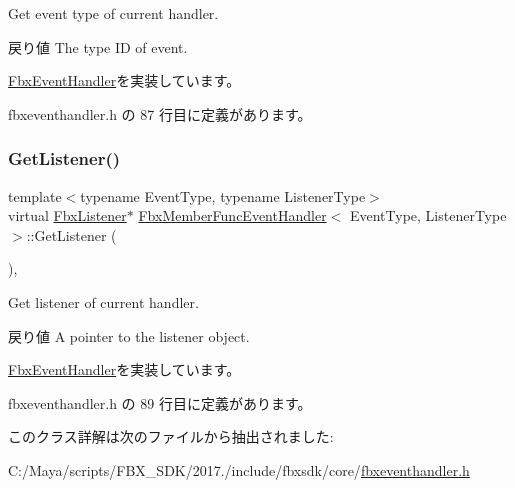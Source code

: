 Get event type of current handler. \begin{DoxyReturn}{戻り値}
The type ID of event. 
\end{DoxyReturn}


\hyperlink{class_fbx_event_handler_a0b42d2b93e63d866975f468a481c9f3c}{Fbx\+Event\+Handler}を実装しています。



 fbxeventhandler.\+h の 87 行目に定義があります。

\mbox{\label{class_fbx_member_func_event_handler_ad45db7b531f23f9e7776c93bec100668}} 
\subsubsection{\texorpdfstring{Get\+Listener()}{GetListener()}}
{\footnotesize\ttfamily template$<$typename Event\+Type, typename Listener\+Type$>$ \\
virtual \hyperlink{class_fbx_listener}{Fbx\+Listener}$\ast$ \hyperlink{class_fbx_member_func_event_handler}{Fbx\+Member\+Func\+Event\+Handler}$<$ Event\+Type, Listener\+Type $>$\+::Get\+Listener (\begin{DoxyParamCaption}{ }\end{DoxyParamCaption})\hspace{0.3cm}{\ttfamily [inline]}, {\ttfamily [virtual]}}

Get listener of current handler. \begin{DoxyReturn}{戻り値}
A pointer to the listener object. 
\end{DoxyReturn}


\hyperlink{class_fbx_event_handler_a6d496102fe1253372bb042840c2d45a7}{Fbx\+Event\+Handler}を実装しています。



 fbxeventhandler.\+h の 89 行目に定義があります。



このクラス詳解は次のファイルから抽出されました\+:\begin{DoxyCompactItemize}
\item 
C\+:/\+Maya/scripts/\+F\+B\+X\+\_\+\+S\+D\+K/2017./include/fbxsdk/core/\hyperlink{fbxeventhandler_8h}{fbxeventhandler.\+h}\end{DoxyCompactItemize}
